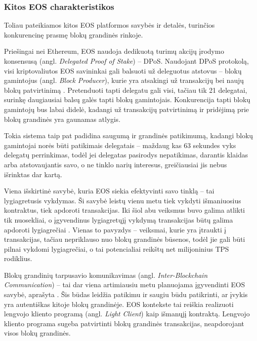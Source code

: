 \documentclass{VUMIFPSkursinis}
\begin{document}
\subsubsection{Kitos EOS charakteristikos}
Toliau pateikiamos kitos EOS platformos savybės ir detalės, turinčios konkurencinę prasmę blokų grandinės rinkoje.

Priešingai nei Ethereum, EOS naudoja dedikuotą turimų akcijų įrodymo konsensusą (angl. \textit{Delegated Proof of Stake}) – DPoS. Naudojant DPoS protokolą, visi kriptovaliutos EOS savininkai gali balsuoti už deleguotus atstovus – blokų gamintojus (angl. \textit{Block Producer}), kurie yra atsakingi už transakcijų bei naujų blokų patvirtinimą \cite{DPoS2018feat}. Pretenduoti tapti delegatu gali visi, tačiau tik 21 delegatai, surinkę daugiausiai balsų galės tapti blokų gamintojais. Konkurencija tapti blokų gamintojų bus labai didelė, kadangi už transakcijų patvirtinimą ir pridėjimą prie blokų grandinės yra gaunamas atlygis. 

Tokia sistema taip pat padidina saugumą ir grandinės patikimumą, kadangi blokų gamintojai norės būti patikimais delegatais – maždaug kas 63 sekundes vyks delegatų perrinkimas, todėl jei delegatas pasirodys nepatikimas, darantis klaidas arba atstovaujantis savo, o ne tinklo narių interesus, greičiausiai jis nebus išrinktas dar kartą.

Viena išskirtinė savybė, kuria EOS siekia efektyvinti savo tinklą – tai lygiagretusis vykdymas. Ši savybė leistų vienu metu tiek vykdyti išmaniuosius kontraktus, tiek apdoroti transakcijas. Iki šiol abu veiksmus buvo galima atlikti tik nuosekliai, o įgyvendinus lygiagretųjį vykdymą transakcijas būtų galima apdoroti lygiagrečiai \cite{vukolic2015quest}. Vienas to pavyzdys – veiksmai, kurie yra įtraukti į transakcijas, tačiau nepriklauso nuo blokų grandinės būsenos, todėl jie gali būti pilnai vykdomi lygiagrečiai, o tai potencialiai reikštų net milijoninius TPS rodiklius.

Blokų grandinių tarpusavio komunikavimas (angl. \textit{Inter-Blockchain Communication}) – tai dar viena artimiausiu metu planuojama įgyvendinti EOS savybė, aprašyta \cite{chen2017inter}. Šis būdas leidžia patikimu ir saugiu būdu patikrinti, ar įvykis yra autentiškas kitoje blokų grandinėje. EOS kontekste tai reiškia realizuoti lengvojo kliento programą (angl. \textit{Light Client}) kaip išmanųjį kontraktą. Lengvojo kliento programa sugeba patvirtinti blokų grandinės transakcijas, neapdorojant visos blokų grandinės.
\end{document}
